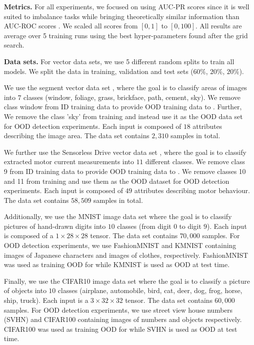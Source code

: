 \textbf{Metrics.} For all experiments, we focused on using AUC-PR scores since it is well suited to imbalance tasks \citep{imbalance_apr} while bringing theoretically similar information than AUC-ROC scores \citep{apr_auroc}. We scaled all scores from $[0, 1]$ to $[0, 100]$. All results are average over 5 training runs using the best hyper-parameters found after the grid search.

\textbf{Data sets.} For vector data sets, we use 5 different random splits to train all models. We split the data in training, validation and test sets ($60\%$, $20\%$, $20\%$). 

We use the segment vector data set \cite{uci_datasets}, where the goal is to classify areas of images into $7$ classes (window, foliage, grass, brickface, path, cement, sky). We remove class window from ID training data to provide OOD training data to \PriorNet. Further, We remove the class 'sky' from training and instead use it as the OOD data set for OOD detection experiments. Each input is composed of $18$ attributes describing the image area. The data set contains $2,310$ samples in total.

We further use the Sensorless Drive vector data set \cite{uci_datasets}, where the goal is to classify extracted motor current measurements into $11$ different classes. We remove class 9 from ID training data to provide OOD training data to \PriorNet. We remove classes 10 and 11 from training and use them as the OOD dataset for OOD detection experiments. Each input is composed of $49$ attributes describing motor behaviour. The data set contains $58,509$ samples in total.

Additionally, we use the MNIST image data set \cite{mnist} where the goal is to classify pictures of hand-drawn digits into $10$ classes (from digit $0$ to digit $9$). Each input is composed of a $1 \times 28 \times 28$ tensor. The data set contains $70,000$ samples. For OOD detection experiments, we use FashionMNIST \cite{fashionmnist} and KMNIST \cite{kmnist} containing images of Japanese characters and images of clothes, respectively. FashionMNIST was used as training OOD for \PriorNet while KMNIST is used as OOD at test time.

Finally, we use the CIFAR10 image data set \cite{cifar10} where the goal is to classify a picture of objects into $10$ classes (airplane, automobile, bird, cat, deer, dog, frog, horse, ship, truck). Each input is a $3 \times 32 \times 32$ tensor. The data set contains $60,000$ samples. For OOD detection experiments, we use street view house numbers (SVHN) \cite{svhn}  and CIFAR100 \citep{cifar10} containing images of numbers and objects respectively. CIFAR100 was used as training OOD for \PriorNet while SVHN is used as OOD at test time.
 
